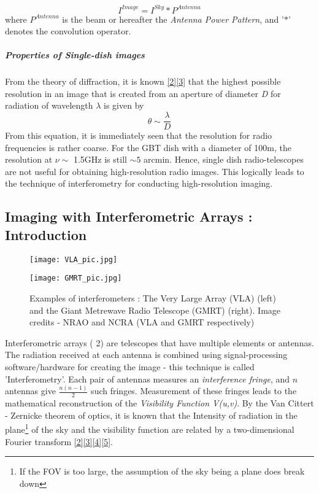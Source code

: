\documentclass{article}
\begin{document}
\begin{equation}
I^{Image} = I^{Sky} * P^{Antenna}
\end{equation}
where $P^{Antenna}$ is the beam or hereafter the \textit{Antenna Power Pattern}, and '$*$' denotes the convolution operator.
\subparagraph{Properties of Single-dish images}
From the theory of diffraction, it is known \hyperref[ref2]{\hyperref[ref2]{[2]}}\hyperref[ref3]{[3]} that the highest possible resolution in an image  that is created from an aperture of diameter \textit{D} for radiation of wavelength $\lambda$ is given by 
\begin{equation}
\theta \sim \frac{\lambda}{D}
\end{equation} 
From this equation, it is immediately seen that the resolution for radio frequencies is rather coarse. For the GBT dish with a diameter of 100m, the resolution at $\nu\sim$ 1.5GHz is still $\sim5$ arcmin. Hence, single dish radio-telescopes are not useful for obtaining high-resolution radio images. This logically leads to the technique of interferometry for conducting high-resolution imaging.
\label{sec1.2}\subsection{Imaging with Interferometric Arrays : Introduction}
\begin{figure}
\centering
\begin{minipage}[b]{.35\textwidth}
\texttt{[image: VLA\_pic.jpg]}
\end{minipage}%
\begin{minipage}[b]{.35\linewidth}
\texttt{[image: GMRT\_pic.jpg]}
\end{minipage}
\caption{Examples of interferometers : The Very Large Array (VLA) (left) and the Giant Metrewave Radio Telescope (GMRT) (right). Image credits - NRAO and NCRA (VLA and GMRT respectively) }
\label{2}
\end{figure}
Interferometric arrays (\figurename{ 2}) are telescopes that have multiple elements or antennas. The radiation received at each antenna is combined using signal-processing software/hardware for creating the image - this technique is called 'Interferometry'. Each pair of antennas measures an \textit{interference fringe}, and $n$ antennas give $\frac{n(n-1)}{2}$ such fringes. Measurement of these fringes leads to the mathematical reconstruction of the \textit{Visibility Function V(u,v)}. By the Van Cittert - Zernicke theorem of optics, it is known that the Intensity of radiation in the plane\footnote{If the FOV is too large, the assumption of the sky being a plane does break down} of the sky and the visibility function are related by a two-dimensional Fourier transform \hyperref[ref2]{[2]}\hyperref[ref3]{[3]}\hyperref[ref4]{[4]}\hyperref[ref5]{[5]}.
\end{document}

